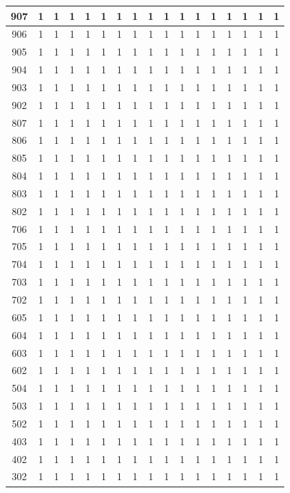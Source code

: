 \begin{itemize}
\begin{longtable}[c]{|c|c|c|c|c|c|c|c|c|c|c|c|c|c|c|c|c|}
907 & 1 & 1 & 1 & 1 & 1 & 1 & 1 & 1 & 1 & 1 & 1 & 1 & 1 & 1 & 1 & 1 \\ \hline
906 & 1 & 1 & 1 & 1 & 1 & 1 & 1 & 1 & 1 & 1 & 1 & 1 & 1 & 1 & 1 & 1 \\ \hline
905 & 1 & 1 & 1 & 1 & 1 & 1 & 1 & 1 & 1 & 1 & 1 & 1 & 1 & 1 & 1 & 1 \\ \hline
904 & 1 & 1 & 1 & 1 & 1 & 1 & 1 & 1 & 1 & 1 & 1 & 1 & 1 & 1 & 1 & 1 \\ \hline
903 & 1 & 1 & 1 & 1 & 1 & 1 & 1 & 1 & 1 & 1 & 1 & 1 & 1 & 1 & 1 & 1 \\ \hline
902 & 1 & 1 & 1 & 1 & 1 & 1 & 1 & 1 & 1 & 1 & 1 & 1 & 1 & 1 & 1 & 1 \\ \hline
807 & 1 & 1 & 1 & 1 & 1 & 1 & 1 & 1 & 1 & 1 & 1 & 1 & 1 & 1 & 1 & 1 \\ \hline
806 & 1 & 1 & 1 & 1 & 1 & 1 & 1 & 1 & 1 & 1 & 1 & 1 & 1 & 1 & 1 & 1 \\ \hline
805 & 1 & 1 & 1 & 1 & 1 & 1 & 1 & 1 & 1 & 1 & 1 & 1 & 1 & 1 & 1 & 1 \\ \hline
804 & 1 & 1 & 1 & 1 & 1 & 1 & 1 & 1 & 1 & 1 & 1 & 1 & 1 & 1 & 1 & 1 \\ \hline
803 & 1 & 1 & 1 & 1 & 1 & 1 & 1 & 1 & 1 & 1 & 1 & 1 & 1 & 1 & 1 & 1 \\ \hline
802 & 1 & 1 & 1 & 1 & 1 & 1 & 1 & 1 & 1 & 1 & 1 & 1 & 1 & 1 & 1 & 1 \\ \hline
706 & 1 & 1 & 1 & 1 & 1 & 1 & 1 & 1 & 1 & 1 & 1 & 1 & 1 & 1 & 1 & 1 \\ \hline
705 & 1 & 1 & 1 & 1 & 1 & 1 & 1 & 1 & 1 & 1 & 1 & 1 & 1 & 1 & 1 & 1 \\ \hline
704 & 1 & 1 & 1 & 1 & 1 & 1 & 1 & 1 & 1 & 1 & 1 & 1 & 1 & 1 & 1 & 1 \\ \hline
703 & 1 & 1 & 1 & 1 & 1 & 1 & 1 & 1 & 1 & 1 & 1 & 1 & 1 & 1 & 1 & 1 \\ \hline
702 & 1 & 1 & 1 & 1 & 1 & 1 & 1 & 1 & 1 & 1 & 1 & 1 & 1 & 1 & 1 & 1 \\ \hline
605 & 1 & 1 & 1 & 1 & 1 & 1 & 1 & 1 & 1 & 1 & 1 & 1 & 1 & 1 & 1 & 1 \\ \hline
604 & 1 & 1 & 1 & 1 & 1 & 1 & 1 & 1 & 1 & 1 & 1 & 1 & 1 & 1 & 1 & 1 \\ \hline
603 & 1 & 1 & 1 & 1 & 1 & 1 & 1 & 1 & 1 & 1 & 1 & 1 & 1 & 1 & 1 & 1 \\ \hline
602 & 1 & 1 & 1 & 1 & 1 & 1 & 1 & 1 & 1 & 1 & 1 & 1 & 1 & 1 & 1 & 1 \\ \hline
504 & 1 & 1 & 1 & 1 & 1 & 1 & 1 & 1 & 1 & 1 & 1 & 1 & 1 & 1 & 1 & 1 \\ \hline
503 & 1 & 1 & 1 & 1 & 1 & 1 & 1 & 1 & 1 & 1 & 1 & 1 & 1 & 1 & 1 & 1 \\ \hline
502 & 1 & 1 & 1 & 1 & 1 & 1 & 1 & 1 & 1 & 1 & 1 & 1 & 1 & 1 & 1 & 1 \\ \hline
403 & 1 & 1 & 1 & 1 & 1 & 1 & 1 & 1 & 1 & 1 & 1 & 1 & 1 & 1 & 1 & 1 \\ \hline
402 & 1 & 1 & 1 & 1 & 1 & 1 & 1 & 1 & 1 & 1 & 1 & 1 & 1 & 1 & 1 & 1 \\ \hline
302 & 1 & 1 & 1 & 1 & 1 & 1 & 1 & 1 & 1 & 1 & 1 & 1 & 1 & 1 & 1 & 1 \\ \hline
\end{longtable}


\end{itemize}
